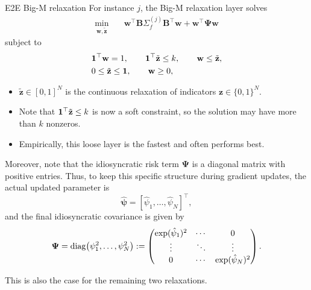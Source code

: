 \documentclass[10pt,aspectratio=169]{beamer}
\newcommand{\Nassets}{N}
\newcommand{\Kcard}{k}
\newcommand{\SigmaMat}{\Sigma}
\begin{document}
\begin{frame}[allowframebreaks]{E2E Big-M relaxation}
  \small 
  For instance $j$, the Big-M relaxation layer solves
  \[
  \begin{aligned}
    \min_{\mathbf w,\tilde{\mathbf z}}\quad 
    &  \mathbf w^\top \mathbf{B} \SigmaMat_f^{(j)} \mathbf{B}^\top \mathbf{w} + \mathbf{w}^\top \boldsymbol{\Psi} \mathbf{w}
    \end{aligned}
  \]
  subject to
  \[
  \begin{aligned}
    & \one^\top \mathbf w=1,\qquad
      \one^\top \tilde{\mathbf z}\le \Kcard,\qquad
      \mathbf w\le \tilde{\mathbf z},\\
    & 0\le \tilde{\mathbf z}\le \one,\qquad
      \mathbf w\ge0,
  \end{aligned}
  \]

  \begin{remark}
    \vspace{0.4em}
      \begin{itemize}
      \item $\tilde{\mathbf z}\in[0,1]^\Nassets$ is the continuous relaxation of indicators $\mathbf{z}\in\{0,1\}^\Nassets$.
      \item Note that $\one^\top \tilde{\mathbf z}\le \Kcard$ is now a soft constraint, so the solution may have more than $k$ nonzeros.
      \item Empirically, this loose layer is the fastest and often performs best.
  \end{itemize}
    
  \end{remark}
  
  \break

  Moreover, note that the idiosyncratic risk term $\boldsymbol{\Psi}$ is a diagonal matrix with positive entries. Thus, to keep this specific structure during gradient updates, the actual updated parameter is
  \[
    \hat{\boldsymbol{\psi}} = [\hat{\psi}_1,\ldots,\hat{\psi}_\Nassets]^\top,
    \]
  and the final idiosyncratic covariance is given by
  \[
    \boldsymbol{\Psi} = 
      \diag\!\left(\psi_1^2,\ldots,\psi_\Nassets^2\right)
    := \begin{pmatrix}
      \exp(\hat{\psi}_1)^2  & \cdots & 0 \\
      \vdots  & \ddots & \vdots \\
      0  & \cdots & \exp(\hat{\psi}_\Nassets)^2
    \end{pmatrix}.
  \]

  This is also the case for the remaining two relaxations.


\end{frame}
\end{document}
